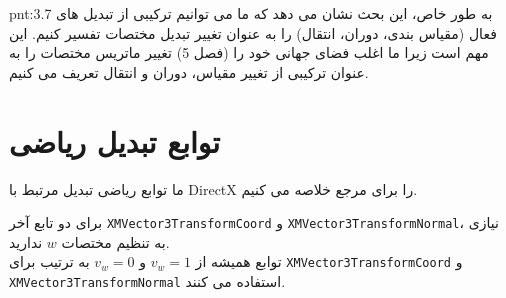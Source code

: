 {\begin{spacing}{1.5}
        \begin{point}{pnt:3.7}
            \Large
            به طور خاص، این بحث نشان می دهد که ما می توانیم ترکیبی از تبدیل های فعال (مقیاس بندی، دوران، انتقال) را به عنوان تغییر تبدیل مختصات تفسیر کنیم.
            این مهم است زیرا ما اغلب فضای جهانی خود را (فصل 5) تغییر ماتریس مختصات را به عنوان ترکیبی از تغییر مقیاس، دوران و انتقال تعریف می کنیم.
        \end{point}
    \end{spacing}
}


\section{\textbf{توابع تبدیل ریاضی }}
\label{sec:3.6}
{
    \Large
    \begin{spacing}{1.5}
        ما توابع ریاضی تبدیل مرتبط با DirectX را برای مرجع خلاصه می کنیم.

        \textbf{\vspace{6pt}}
        \lr{}
        \textbf{\vspace{6pt}}

        برای دو تابع آخر \texttt{XMVector3TransformCoord} و \texttt{XMVector3TransformNormal}، نیازی به تنظیم مختصات $w$ ندارید.\\
        توابع همیشه از $v_{w}=1$ و $v_{w}=0$ به ترتیب برای \texttt{XMVector3TransformCoord} و \texttt{XMVector3TransformNormal} استفاده می کنند.
    \end{spacing}
}
\newpage


